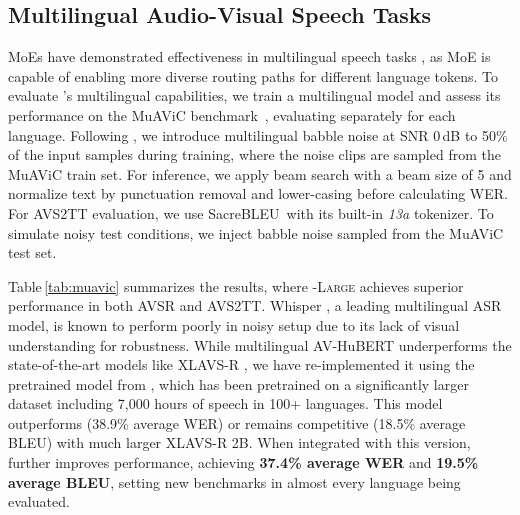 \vspace{-5pt}
\subsection{Multilingual Audio-Visual Speech Tasks}
\vspace{-5pt}

MoEs have demonstrated effectiveness in multilingual speech tasks \citep{hu2023mixture, wang2023language}, as MoE is capable of enabling more diverse routing paths for different language tokens. To evaluate \ourmodel's multilingual capabilities, we train a multilingual model and assess its performance on the MuAViC benchmark~\citep{anwar2023muavic}, evaluating separately for each language.
%
Following \citet{han-etal-2024-xlavs}, we introduce multilingual babble noise at SNR 0\,dB to 50\% of the input samples during training, where the noise clips are sampled from the MuAViC train set. For inference, we apply beam search with a beam size of 5 and normalize text by punctuation removal and lower-casing before calculating WER. For AVS2TT evaluation, we use SacreBLEU\,\cite{post2018call} with its built-in \textit{13a} tokenizer. To simulate noisy test conditions, we inject babble noise sampled from the MuAViC test set.

Table\,\ref{tab:muavic} summarizes the results, where \ourmodel-\textsc{Large} achieves superior performance in both AVSR and AVS2TT. Whisper \cite{radford2023robust}, a leading multilingual ASR model, is known to perform poorly in noisy setup due to its lack of visual understanding for robustness. While multilingual AV-HuBERT \cite{anwar2023muavic} underperforms the state-of-the-art models like XLAVS-R \cite{han-etal-2024-xlavs}, we have re-implemented it using the pretrained model from \citet{choi2024av2av}, which has been pretrained on a significantly larger dataset including 7,000 hours of speech in 100+ languages. This model outperforms (38.9\% average WER) or remains competitive (18.5\% average BLEU) with much larger XLAVS-R 2B. When integrated with this version, \ourmodel further improves performance, achieving \textbf{37.4\% average WER} and \textbf{19.5\% average BLEU}, setting new benchmarks in almost every language being evaluated.
